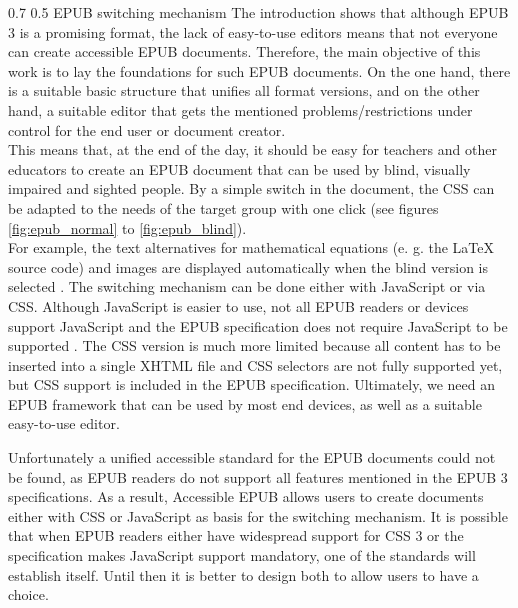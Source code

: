 \documentclass{llncs}
\makeatletter
\renewcommand\subsection{\@startsection 
   {subsection}{2}{0mm}%
   {0.7\baselineskip}%
   {0.5\baselineskip}%
   {\bfseries\large}%
   }
\makeatother
\begin{document}
\subsection{EPUB switching mechanism}
The introduction shows that although EPUB 3 is a promising format, the lack of easy-to-use editors means that not everyone can create accessible EPUB documents. Therefore, the main objective of this work is to lay the foundations for such EPUB documents. On the one hand, there is a suitable basic structure that unifies all format versions, and on the other hand, a suitable editor that gets the mentioned problems/restrictions under control for the end user or document creator.\\
This means that, at the end of the day, it should be easy for teachers and other educators to create an EPUB document that can be used by blind, visually impaired and sighted people. By a simple switch in the document, the CSS can be adapted to the needs of the target group with one click (see figures \ref{fig:epub_normal} to \ref{fig:epub_blind}).\\
For example, the text alternatives for mathematical equations (e. g. the \LaTeX $\mbox{ }$ source code) and images are displayed automatically when the blind version is selected \cite{EPUB3bp}. The switching mechanism can be done either with JavaScript or via CSS. Although JavaScript is easier to use, not all EPUB readers or devices support JavaScript and the EPUB specification does not require JavaScript to be supported \cite{EPUB3bp}. The CSS version is much more limited because all content has to be inserted into a single XHTML file and CSS selectors are not fully supported yet, but CSS support is included in the EPUB specification. Ultimately, we need an EPUB framework that can be used by most end devices, as well as a suitable easy-to-use editor.

Unfortunately a unified accessible standard for the EPUB documents could not be found, as EPUB readers do not support all features mentioned in the EPUB 3 specifications. As a result, Accessible EPUB allows users to create documents either with CSS or JavaScript as basis for the switching mechanism. It is possible that when EPUB readers either have  widespread support for CSS 3 or the specification makes JavaScript support mandatory, one of the standards will establish itself. Until then it is better to design both to allow users to have a choice.
\end{document}

